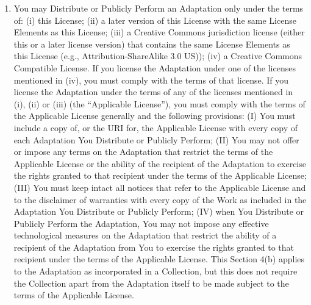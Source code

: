 \documentclass[letterpaper,10pt,english]{manual}
\begin{document}
\begin{enumerate}
\begin{enumerate}
\item {} 
You may Distribute or Publicly Perform an Adaptation only under the terms of: (i) this License; (ii) a later version of this License with the same License Elements as this License; (iii) a Creative Commons jurisdiction license (either this or a later license version) that contains the same License Elements as this License (e.g., Attribution-ShareAlike 3.0 US)); (iv) a Creative Commons Compatible License. If you license the Adaptation under one of the licenses mentioned in (iv), you must comply with the terms of that license. If you license the Adaptation under the terms of any of the licenses mentioned in (i), (ii) or (iii) (the ``Applicable License''), you must comply with the terms of the Applicable License generally and the following provisions: (I) You must include a copy of, or the URI for, the Applicable License with every copy of each Adaptation You Distribute or Publicly Perform; (II) You may not offer or impose any terms on the Adaptation that restrict the terms of the Applicable License or the ability of the recipient of the Adaptation to exercise the rights granted to that recipient under the terms of the Applicable License; (III) You must keep intact all notices that refer to the Applicable License and to the disclaimer of warranties with every copy of the Work as included in the Adaptation You Distribute or Publicly Perform; (IV) when You Distribute or Publicly Perform the Adaptation, You may not impose any effective technological measures on the Adaptation that restrict the ability of a recipient of the Adaptation from You to exercise the rights granted to that recipient under the terms of the Applicable License. This Section 4(b) applies to the Adaptation as incorporated in a Collection, but this does not require the Collection apart from the Adaptation itself to be made subject to the terms of the Applicable License.


\end{enumerate}
\end{enumerate}
\end{document}
